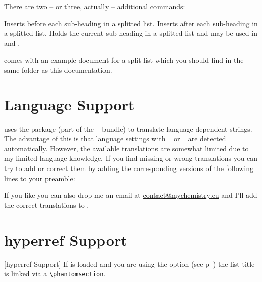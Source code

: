\documentclass[toc=bib,toc=index]{cnpkgdoc}
\makeatletter
\providecommand*\sinceversion[1]{%
  \@bsphack
  \marginnote{%
    \footnotesize\sffamily\RaggedRight
    \textcolor{black!75}{Introduced in version~#1}}%
  \@esphack}
\makeatother
\begin{document}
\sinceversion{0.7}There are two -- or three, actually -- additional commands:
\begin{beschreibung}
 \newline
   Inserts  before each sub-heading in a splitted list.
 \newline
   Inserts  after each sub-heading in a splitted list.
 \newline
   Holds the current sub-heading in a splitted list and may be used in
    and .
\end{beschreibung}


\enotez comes with an example document for a split list which you should
find in the same folder as this documentation.

\section{Language Support}
\enotez uses the  package (part of the
~\cite{pkg:exsheets} bundle) to translate language dependent
strings. The advantage of this is that language settings with
~\cite{pkg:babel} or ~\cite{pkg:polyglossia}
are detected automatically. However, the available translations are somewhat
limited due to my limited language knowledge. If you find missing or wrong
translations you can try to add or correct them by adding the corresponding
versions of the following lines to your preamble:
\begin{beispiel}
\end{beispiel}
If you like you can also drop me an email at
\href{mailto:contact@mychemistry.eu}{contact@mychemistry.eu} and I'll add the
correct translations to \enotez.

\section{hyperref Support}[hyperref Support]
If  is loaded and you are using the option  (see
p~\pageref{key:totoc}) the list title is linked via a \verb=\phantomsection=.
\end{document}
